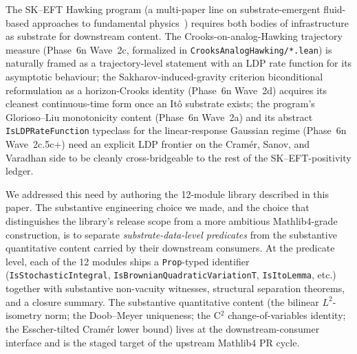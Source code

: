 \documentclass[11pt]{article}
\begin{document}
The SK--EFT Hawking program (a multi-paper line on substrate-emergent
fluid-based approaches to fundamental
physics~\cite{Roehm2026Strategy}) requires both bodies of
infrastructure as substrate for downstream content. The Crooks-on-analog-Hawking
trajectory measure (Phase~6n Wave~2c, formalized in
\texttt{CrooksAnalogHawking/*.lean}) is naturally framed as a
trajectory-level statement with an LDP rate function for its
asymptotic behaviour; the Sakharov-induced-gravity criterion
biconditional reformulation as a horizon-Crooks identity (Phase~6n
Wave~2d) acquires its cleanest continuous-time form once an It\^o
substrate exists; the program's Glorioso--Liu monotonicity content
(Phase~6n Wave~2a) and its abstract \texttt{IsLDPRateFunction}
typeclass for the linear-response Gaussian regime (Phase~6n
Wave~2c.5c+) need an explicit LDP frontier on the Cram\'er, Sanov,
and Varadhan side to be cleanly cross-bridgeable to the rest of the
SK--EFT-positivity ledger.

We addressed this need by authoring the 12-module library described
in this paper. The substantive engineering choice we made, and the
choice that distinguishes the library's release scope from a more
ambitious Mathlib4-grade construction, is to separate
\emph{substrate-data-level predicates} from the substantive quantitative
content carried by their downstream consumers. At the predicate level,
each of the 12 modules ships a \texttt{Prop}-typed identifier
(\texttt{IsStochasticIntegral}, \texttt{IsBrownianQuadraticVariationT},
\texttt{IsItoLemma}, etc.) together with substantive non-vacuity
witnesses, structural separation theorems, and a closure summary.
The substantive quantitative content (the bilinear $L^2$-isometry
norm; the Doob--Meyer uniqueness; the C${}^2$ change-of-variables
identity; the Esscher-tilted Cram\'er lower bound) lives at the
downstream-consumer interface and is the staged target of the
upstream Mathlib4 PR cycle.
\end{document}
